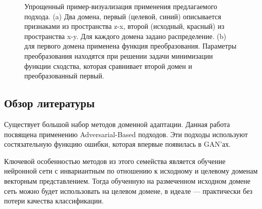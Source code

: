 \documentclass[12pt]{extarticle}
\begin{document}
\begin{figure}[H]
        \centering
        \qquad
        
        \caption{Упрощенный пример-визуализация применения предлагаемого подхода. (a) Два домена, первый (целевой, синий) описывается признаками из пространства z-x, второй (исходный, красный) из  пространства x-y. Для каждого домена задано распределение. (b) для первого домена применена функция преобразования. Параметры преобразования находятся при решении задачи минимизации функции сходства, которая сравнивает второй домен и преобразованный первый.}
    \end{figure}
    
\newpage

\subsection{Обзор литературы}

Существует большой набор методов доменной адаптации. Данная работа посвящена применению Adversarial-Based подходов. Эти подходы используют состязательную функцию ошибки, которая впервые появилась в GAN'ах.

Ключевой особенностью методов из этого семейства является обучение нейронной сети с инвариантным по отношению к исходному и целевому доменам векторным представлением. Тогда обученную на размеченном исходном домене сеть можно будет использовать на целевом домене, в идеале — практически без потери качества классификации.
\end{document}
